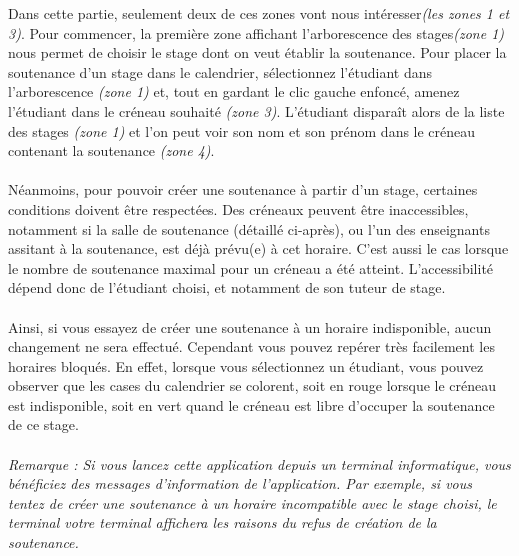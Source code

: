 \documentclass[a4paper,10pt]{report}
\begin{document}
	  Dans cette partie, seulement deux de ces zones vont nous intéresser\textit{(les zones 1 et 3)}.
	  Pour commencer, la première zone affichant l'arborescence des stages\textit{(zone 1)} nous permet de choisir le stage dont on veut établir la soutenance.
	  Pour placer la soutenance d'un stage dans le calendrier, sélectionnez l'étudiant dans l'arborescence \textit{(zone 1)} et, tout en gardant le clic gauche enfoncé, amenez l'étudiant dans le créneau souhaité \textit{(zone 3)}.
	  L'étudiant disparaît alors de la liste des stages \textit{(zone 1)} et l'on peut voir son nom et son prénom dans le créneau contenant la soutenance \textit{(zone 4)}.
	  
	\paragraph{}
	  Néanmoins, pour pouvoir créer une soutenance à partir d'un stage, certaines conditions doivent être respectées.
	  Des créneaux peuvent être inaccessibles, notamment si la salle de soutenance (détaillé ci-après), ou l'un des enseignants assitant à la soutenance, est déjà prévu(e) à cet horaire.
	  C'est aussi le cas lorsque le nombre de soutenance maximal pour un créneau a été atteint.
	  L'accessibilité dépend donc de l'étudiant choisi, et notamment de son tuteur de stage.
	
	\paragraph{}
	  Ainsi, si vous essayez de créer une soutenance à un horaire indisponible, aucun changement ne sera effectué.
	  Cependant vous pouvez repérer très facilement les horaires bloqués.
	  En effet, lorsque vous sélectionnez un étudiant, vous pouvez observer que les cases du calendrier se colorent, soit en rouge lorsque le créneau est indisponible, soit en vert quand le créneau est libre d'occuper la soutenance de ce stage.
	  
	\paragraph{}
	  \textit{Remarque : Si vous lancez cette application depuis un terminal informatique, vous bénéficiez des messages d'information de l'application. Par exemple, si vous tentez de créer une soutenance à un horaire incompatible avec le stage choisi, le terminal votre terminal affichera les raisons du refus de création de la soutenance.}
	
\end{document}
